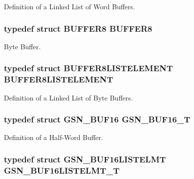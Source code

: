 Definition of a Linked List of Word Buffers. 

\hypertarget{a00654_gaa4fdb17d0c3544bbb3e8e9dabe0bb1f6}{
\subsubsection[{BUFFER8}]{\setlength{\rightskip}{0pt plus 5cm}typedef struct {\bf BUFFER8}  {\bf BUFFER8}}}
\label{a00654_gaa4fdb17d0c3544bbb3e8e9dabe0bb1f6}


Byte Buffer. 

\hypertarget{a00654_ga908a8d75645fed38ef8093ab5674e461}{
\subsubsection[{BUFFER8LISTELEMENT}]{\setlength{\rightskip}{0pt plus 5cm}typedef struct {\bf BUFFER8LISTELEMENT}  {\bf BUFFER8LISTELEMENT}}}
\label{a00654_ga908a8d75645fed38ef8093ab5674e461}


Definition of a Linked List of Byte Buffers. 

\hypertarget{a00654_ga4fdddff0bde69bd592327bf3914b4c39}{
\subsubsection[{GSN\_\-BUF16\_\-T}]{\setlength{\rightskip}{0pt plus 5cm}typedef struct {\bf GSN\_\-BUF16}  {\bf GSN\_\-BUF16\_\-T}}}
\label{a00654_ga4fdddff0bde69bd592327bf3914b4c39}


Definition of a Half-\/Word Buffer. 

\hypertarget{a00654_ga6635dc0a6b962b379e55c1fff1ab6298}{
\subsubsection[{GSN\_\-BUF16LISTELMT\_\-T}]{\setlength{\rightskip}{0pt plus 5cm}typedef struct {\bf GSN\_\-BUF16LISTELMT}  {\bf GSN\_\-BUF16LISTELMT\_\-T}}}
\label{a00654_ga6635dc0a6b962b379e55c1fff1ab6298}


